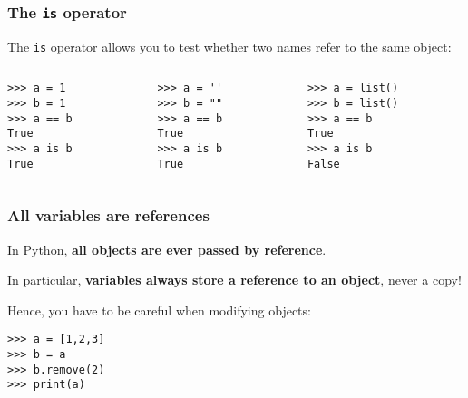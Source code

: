 \documentclass[english,serif,mathserif,xcolor=pdftex,dvipsnames,table]{beamer}
\begin{document}
\begin{frame}[fragile]
  \frametitle{The \texttt{is} operator}

  The \texttt{is} operator allows you to test whether two names refer
  to the same object:
  \begin{columns}
    \begin{column}{0.3\linewidth}
\begin{lstlisting}
>>> a = 1
>>> b = 1
>>> a == b
True
>>> a is b
True
\end{lstlisting}
    \end{column}
    \begin{column}{0.3\linewidth}
\begin{lstlisting}
>>> a = ''
>>> b = ""
>>> a == b
True
>>> a is b
True
\end{lstlisting}
    \end{column}
    \begin{column}{0.3\linewidth}
\begin{lstlisting}
>>> a = list()
>>> b = list()
>>> a == b
True
>>> a is b
False
\end{lstlisting}
    \end{column}
  \end{columns}

\end{frame}


\begin{frame}[fragile]
  \frametitle{All variables are references}

  In Python, \textbf{all objects are ever passed by reference}.

  \+
  In particular, \textbf{variables always store a reference to an
    object}, never a copy!

  \+
  Hence, you have to be careful when modifying objects:
\begin{lstlisting}
>>> a = [1,2,3]
>>> b = a
>>> b.remove(2)
>>> print(a)
\end{lstlisting}
\end{frame}
\end{document}
